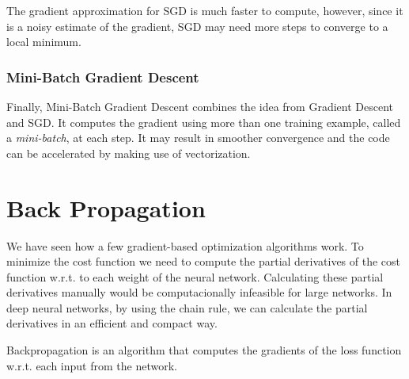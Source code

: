The gradient approximation for SGD is much faster to compute, however, since it is a noisy estimate of the gradient,
SGD may need more steps to converge to a local minimum.

\subsubsection{Mini-Batch Gradient Descent}
Finally, Mini-Batch Gradient Descent combines the idea from Gradient Descent and SGD.
It computes the gradient using more than one training example, called a \textit{mini-batch}, at each step. It may result
in smoother convergence and the code can be accelerated by making use of vectorization.

\section{Back Propagation}
\label{subsec:back_prop}

We have seen how a few gradient-based optimization algorithms work. 
To minimize the cost function we need to compute the partial derivatives of the cost function w.r.t. 
to each weight of the neural network. Calculating these partial derivatives manually would be computacionally
infeasible for large networks.
In deep neural networks, by using the chain rule, we can calculate the partial derivatives in an efficient and
compact way.

Backpropagation is an algorithm that computes the gradients of the loss function w.r.t. each input from the network.



